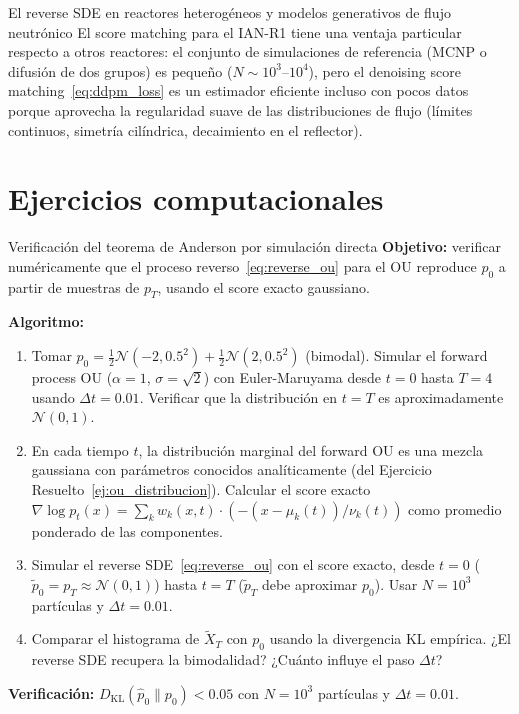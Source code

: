 \begin{estrella}{El reverse SDE en reactores heterogéneos y modelos generativos de flujo neutrónico}
El score matching para el IAN-R1 tiene una ventaja particular respecto a
otros reactores: el conjunto de simulaciones de referencia (MCNP o difusión
de dos grupos) es pequeño ($N \sim 10^3$--$10^4$), pero el denoising score
matching~\eqref{eq:ddpm_loss} es un estimador eficiente incluso con pocos datos
porque aprovecha la regularidad suave de las distribuciones de flujo (límites
continuos, simetría cilíndrica, decaimiento en el reflector).
\end{estrella}

\section*{Ejercicios computacionales}

\begin{ejerciciocomp}{Verificación del teorema de Anderson por simulación directa}
\textbf{Objetivo:} verificar numéricamente que el proceso reverso~\eqref{eq:reverse_ou}
para el OU reproduce $p_0$ a partir de muestras de $p_T$, usando el score exacto
gaussiano.

\medskip\noindent\textbf{Algoritmo:}
\begin{enumerate}
  \item Tomar $p_0 = \frac{1}{2}\mathcal{N}(-2, 0.5^2) + \frac{1}{2}\mathcal{N}(2, 0.5^2)$
        (bimodal). Simular el forward process OU ($\alpha=1$, $\sigma=\sqrt{2}$)
        con Euler-Maruyama desde $t=0$ hasta $T=4$ usando $\Delta t = 0.01$.
        Verificar que la distribución en $t=T$ es aproximadamente $\mathcal{N}(0,1)$.
  \item En cada tiempo $t$, la distribución marginal del forward OU es una
        mezcla gaussiana con parámetros conocidos analíticamente (del Ejercicio
        Resuelto~\ref{ej:ou_distribucion}). Calcular el score exacto
        $\nabla\log p_t(x) = \sum_k w_k(x,t)\cdot(-(x-\mu_k(t))/\nu_k(t))$
        como promedio ponderado de las componentes.
  \item Simular el reverse SDE~\eqref{eq:reverse_ou} con el score exacto,
        desde $t=0$ ($\tilde{p}_0 = p_T \approx \mathcal{N}(0,1)$) hasta $t=T$
        ($\tilde{p}_T$ debe aproximar $p_0$). Usar $N=10^3$ partículas y
        $\Delta t = 0.01$.
  \item Comparar el histograma de $\tilde{X}_T$ con $p_0$ usando la divergencia
        KL empírica. ¿El reverse SDE recupera la bimodalidad? ¿Cuánto influye
        el paso $\Delta t$?
\end{enumerate}
\medskip\noindent\textbf{Verificación:} $D_\mathrm{KL}(\hat{p}_0\|p_0) < 0.05$
con $N = 10^3$ partículas y $\Delta t = 0.01$.
\end{ejerciciocomp}

